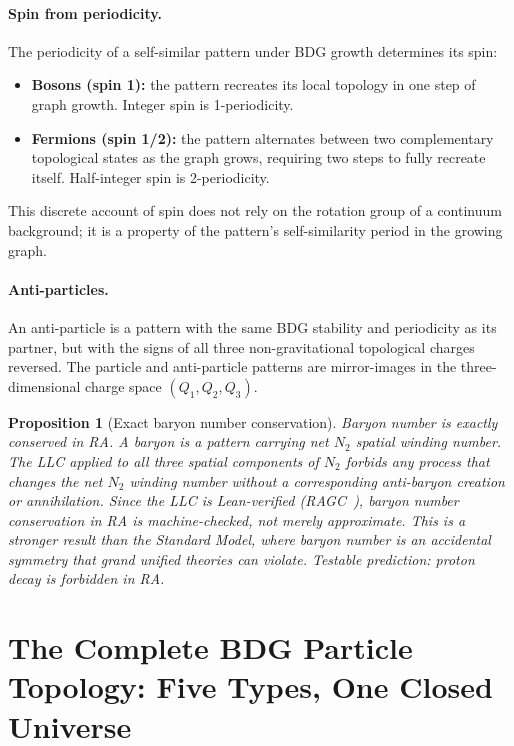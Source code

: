 \documentclass[11pt,a4paper]{article}
\newtheorem{proposition}[theorem]{Proposition}
\begin{document}
\paragraph{Spin from periodicity.}
The periodicity of a self-similar pattern under BDG growth determines its spin:
\begin{itemize}[noitemsep]
  \item \textbf{Bosons (spin 1):} the pattern recreates its local topology
  in one step of graph growth. Integer spin is 1-periodicity.
  \item \textbf{Fermions (spin 1/2):} the pattern alternates between two
  complementary topological states as the graph grows, requiring two steps
  to fully recreate itself. Half-integer spin is 2-periodicity.
\end{itemize}
This discrete account of spin does not rely on the rotation group of a
continuum background; it is a property of the pattern's self-similarity
period in the growing graph.

\paragraph{Anti-particles.}
An anti-particle is a pattern with the same BDG stability and periodicity
as its partner, but with the signs of all three non-gravitational topological
charges reversed. The particle and anti-particle patterns are
mirror-images in the three-dimensional charge space $(Q_1, Q_2, Q_3)$.

\begin{proposition}[Exact baryon number conservation]
\label{prop:baryon}
Baryon number is exactly conserved in RA. A baryon is a pattern carrying
net $N_2$ spatial winding number. The LLC applied to all three spatial
components of $N_2$ forbids any process that changes the net $N_2$ winding
number without a corresponding anti-baryon creation or annihilation.
Since the LLC is Lean-verified (RAGC~\citep{Sandeman2026RAGC}), baryon
number conservation in RA is machine-checked, not merely approximate.
This is a stronger result than the Standard Model, where baryon number
is an accidental symmetry that grand unified theories can violate.
\emph{Testable prediction:} proton decay is forbidden in RA.
\end{proposition}


\section{The Complete BDG Particle Topology: Five Types, One Closed Universe}
\label{sec:topology_of_matter}
\end{document}
